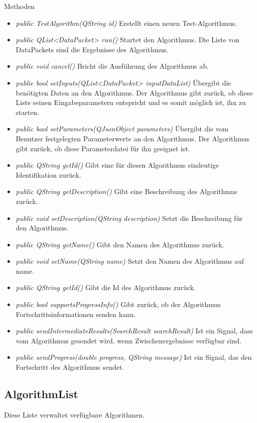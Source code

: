 Methoden
\begin{itemize}
\item\textit{public TestAlgorithm(QString id)} Erstellt einen neuen Test-Algorithmus.
\item\textit{public QList<DataPacket> run()} Startet den Algorithmus. Die Liste von DataPackets sind die Ergebnisse des Algorithmus.
\item\textit{public void cancel()} Bricht die Ausführung des Algorithmus ab.
\item\textit{public bool setInputs(QList<DataPacket> inputDataList)} Übergibt die benötigten Daten an den Algorithmus. Der Algorithmus gibt zurück, ob diese Liste seinen Eingabeparametern entspricht und es somit möglich ist, ihn zu starten.
\item\textit{public bool setParameters(QJsonObject parameters)} Übergibt die vom Benutzer festgelegten Parameterwerte an den Algorithmus. Der Algorithmus gibt zurück, ob diese Parameterdatei für ihn geeignet ist.
\item\textit{public QString getId()} Gibt eine für diesen Algorithmus eindeutige Identifikation zurück.
\item\textit{public QString getDescription()} Gibt eine Beschreibung des Algorithmus zurück.
\item\textit{public void setDescription(QString description)} Setzt die Beschreibung für den Algorithmus.
\item\textit{public QString getName()} Gibt den Namen des Algorithmus zurück.
\item\textit{public void setName(QString name)} Setzt den Namen des Algorithmus auf name.
\item\textit{public QString getId()} Gibt die Id des Algorithmus zurück.
\item\textit{public bool supportsProgressInfo()} Gibt zurück, ob der Algorithmus Fortschrittsinformationen senden kann.
\item\textit{public sendIntermediateResults(SearchResult searchResult)} Ist ein Signal, dass vom Algorithmus gesendet wird, wenn Zwischenergebnisse verfügbar sind.
\item\textit{public sendProgress(double progress, QString message)} Ist ein Signal, das den Fortschritt des Algorithmus sendet.
\end{itemize}

\subsection*{AlgorithmList}
Diese Liste verwaltet verfügbare Algorithmen.

